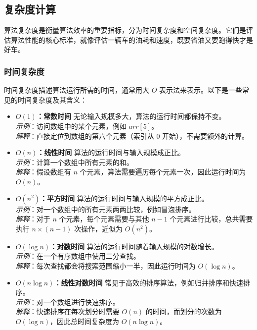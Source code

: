 \documentclass[lang=cn,newtx,10pt,scheme=chinese]{../elegantbook}
\begin{document}
\subsection{复杂度计算}
算法复杂度是衡量算法效率的重要指标，分为时间复杂度和空间复杂度。它们是评估算法性能的核心标准，就像评估一辆车的油耗和速度，既要省油又要跑得快才是好车。

\subsubsection{时间复杂度}
时间复杂度描述算法运行所需的时间，通常用大 $O$ 表示法来表示。以下是一些常见的时间复杂度及其含义：

\begin{itemize}
    \item \textbf{$O(1)$：常数时间}
    无论输入规模多大，算法的运行时间都保持不变。\\
    \textit{示例}：访问数组中的某个元素，例如 $arr[5]$。\\
    \textit{解释}：直接定位到数组的第六个元素（索引从 0 开始），不需要额外的计算。

    \item \textbf{$O(n)$：线性时间}
    算法的运行时间与输入规模成正比。\\
    \textit{示例}：计算一个数组中所有元素的和。\\
    \textit{解释}：假设数组有 $n$ 个元素，算法需要遍历每个元素一次，因此运行时间为 $O(n)$。

    \item \textbf{$O(n^2)$：平方时间}
    算法的运行时间与输入规模的平方成正比。\\
    \textit{示例}：对一个数组中的所有元素两两比较，例如冒泡排序。\\
    \textit{解释}：对于 $n$ 个元素，每个元素需要与其他 $n-1$ 个元素进行比较，总共需要执行 $n \times (n-1)$ 次操作，近似为 $O(n^2)$。

    \item \textbf{$O(\log n)$：对数时间}
    算法的运行时间随着输入规模的对数增长。\\
    \textit{示例}：在一个有序数组中使用二分查找。\\
    \textit{解释}：每次查找都会将搜索范围缩小一半，因此运行时间为 $O(\log n)$。

    \item \textbf{$O(n \log n)$：线性对数时间}
    常见于高效的排序算法，例如归并排序和快速排序。\\
    \textit{示例}：对一个数组进行快速排序。\\
    \textit{解释}：快速排序在每次划分时需要 $O(n)$ 的时间，而划分的次数为 $O(\log n)$，因此总时间复杂度为 $O(n \log n)$。
\end{itemize}
\end{document}
